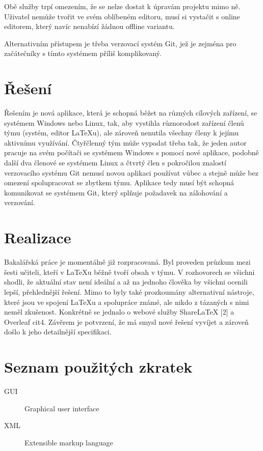 \documentclass[thesis=B,czech]{FITthesis}[2012/06/26]
\begin{document}
Obě služby trpí omezením, že se nelze dostat k úpravám projektu mimo ně. Uživatel nemůže tvořit ve svém oblíbeném editoru, musí si vystačit s online editorem, který navíc nenabízí žádnou offline variantu.

Alternativním přístupem je třeba verzovací systém Git, jež je zejména pro začátečníky s tímto systémem příliš komplikovaný.

\chapter{Řešení}
Řešením je nová aplikace, která je schopná běžet na různých cílových zařízení, se systémem Windows nebo Linux, tak, aby vystihla různorodost zařízení členů týmu (systém, editor LaTeXu), ale zároveň nenutila všechny členy k jejímu aktivnímu využívání. Čtyřčlenný tým může vypadat třeba tak, že jeden autor pracuje na svém počítači se systémem Windows s pomocí nové aplikace, podobně další dva členové se systémem Linux a čtvrtý člen s pokročilou znalostí verzovacího systému Git nemusí novou aplikaci používat vůbec a stejně může bez omezení spolupracovat se zbytkem týmu. Aplikace tedy musí být schopná komunikovat se systémem Git, který splňuje požadavek na zálohování a verzování.

\chapter{Realizace}

\begin{conclusion}
	Bakalářská práce je momentálně již rozpracovaná. Byl proveden průzkum mezi šesti učiteli, kteří v LaTeXu běžně tvoří obsah v týmu. V rozhovorech se všichni shodli, že aktuální stav není ideální a až na jednoho člověka by všichni ocenili lepší, přehlednější řešení. Mimo to byly také prozkoumány alternativní nástroje, které jsou ve spojení LaTeXu a spolupráce známé, ale nikdo z tázaných s nimi neměl zkušenost. Konkrétně se jednalo o webové služby ShareLaTeX [2] a Overleaf {cit4}. Závěrem je potvrzení, že má smysl nové řešení vyvíjet a zároveň došlo k jeho detailnější specifikaci.
\end{conclusion}




\appendix

\chapter{Seznam použitých zkratek}
\begin{description}
	\item[GUI] Graphical user interface
	\item[XML] Extensible markup language
\end{description}
\end{document}
